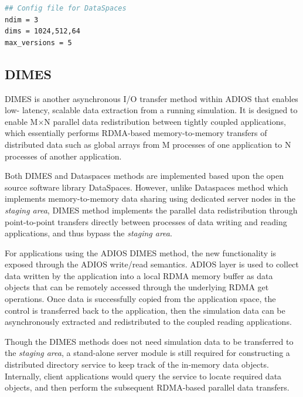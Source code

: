 \begin{lstlisting}[language=bash, caption=''Example configuration file dataspaces.conf. Dimension order is Fortran order.'']
## Config file for DataSpaces
ndim = 3
dims = 1024,512,64
max_versions = 5
\end{lstlisting}


\subsection{DIMES}
\label{section-method-dimes}
DIMES is another asynchronous I/O transfer method within ADIOS that enables low-
latency, scalable data extraction from a running simulation. It is designed to enable M$
\times$N parallel data redistribution between tightly coupled applications, which 
essentially performs RDMA-based memory-to-memory transfers of distributed data such 
as global arrays from M processes of one application to N processes of another application.

Both DIMES and Dataspaces methods are implemented based upon the open source 
software library DataSpaces. However, unlike Dataspaces method which implements 
memory-to-memory data sharing using dedicated server nodes in the \emph{staging 
area}, DIMES method implements the parallel data redistribution through point-to-point 
transfers directly between processes of data writing and reading applications, and thus 
bypass the \emph{staging area}. 

For applications using the ADIOS DIMES method, the new functionality is exposed 
through the ADIOS write/read semantics. ADIOS layer is used to collect data written by 
the application into a local RDMA memory buffer as data objects that can 
be remotely accessed through the underlying RDMA get operations. Once data is 
successfully copied from the application space, the control is transferred back to the 
application, then the simulation data can be asynchronously extracted and redistributed 
to the coupled reading applications. 

Though the DIMES methods does not need simulation data to be transferred to the 
\emph{staging area}, a stand-alone server module is still required for constructing a 
distributed directory service to keep track of the in-memory data objects. Internally, client 
applications would query the service to locate required data objects, and then perform 
the subsequent RDMA-based parallel data transfers. 

